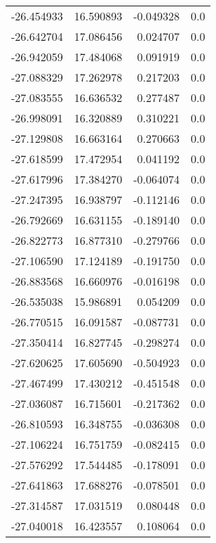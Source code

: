 \begin{tabular}{rrrr}
      -26.454933 &        16.590893 &   -0.049328 &   0.0 \\
      -26.642704 &        17.086456 &    0.024707 &   0.0 \\
      -26.942059 &        17.484068 &    0.091919 &   0.0 \\
      -27.088329 &        17.262978 &    0.217203 &   0.0 \\
      -27.083555 &        16.636532 &    0.277487 &   0.0 \\
      -26.998091 &        16.320889 &    0.310221 &   0.0 \\
      -27.129808 &        16.663164 &    0.270663 &   0.0 \\
      -27.618599 &        17.472954 &    0.041192 &   0.0 \\
      -27.617996 &        17.384270 &   -0.064074 &   0.0 \\
      -27.247395 &        16.938797 &   -0.112146 &   0.0 \\
      -26.792669 &        16.631155 &   -0.189140 &   0.0 \\
      -26.822773 &        16.877310 &   -0.279766 &   0.0 \\
      -27.106590 &        17.124189 &   -0.191750 &   0.0 \\
      -26.883568 &        16.660976 &   -0.016198 &   0.0 \\
      -26.535038 &        15.986891 &    0.054209 &   0.0 \\
      -26.770515 &        16.091587 &   -0.087731 &   0.0 \\
      -27.350414 &        16.827745 &   -0.298274 &   0.0 \\
      -27.620625 &        17.605690 &   -0.504923 &   0.0 \\
      -27.467499 &        17.430212 &   -0.451548 &   0.0 \\
      -27.036087 &        16.715601 &   -0.217362 &   0.0 \\
      -26.810593 &        16.348755 &   -0.036308 &   0.0 \\
      -27.106224 &        16.751759 &   -0.082415 &   0.0 \\
      -27.576292 &        17.544485 &   -0.178091 &   0.0 \\
      -27.641863 &        17.688276 &   -0.078501 &   0.0 \\
      -27.314587 &        17.031519 &    0.080448 &   0.0 \\
      -27.040018 &        16.423557 &    0.108064 &   0.0 \\

\end{tabular}
